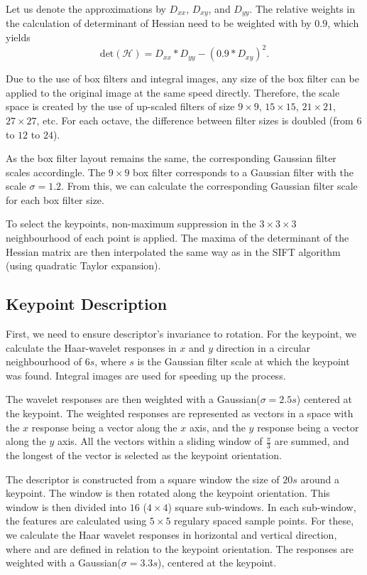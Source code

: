 Let us denote the approximations by $D_{xx}$, $D_{xy}$, and $D_{yy}$. The relative weights in the calculation of determinant of Hessian need to be weighted with by $0.9$, which yields
\begin{equation}
    \text{det}(\mathcal{H}) = D_{xx} * D_{yy} - (0.9 * D_{xy})^{2}.
\end{equation}

Due to the use of box filters and integral images, any size of the box filter can be applied to the original image at the same speed directly. Therefore, the scale space is created by the use of up-scaled filters of size $9\times9$, $15\times15$, $21\times21$, $27\times27$, etc. For each octave, the difference between filter sizes is doubled (from $6$ to $12$ to $24$).

As the box filter layout remains the same, the corresponding Gaussian filter scales accordingle. The $9\times9$ box filter corresponds to a Gaussian filter with the scale $\sigma = 1.2$. From this, we can calculate the corresponding Gaussian filter scale for each box filter size.

To select the keypoints, non-maximum suppression in the $3\times3\times3$ neighbourhood of each point is applied. The maxima of the determinant of the Hessian matrix are then interpolated the same way as in the SIFT algorithm (using quadratic Taylor expansion).

\subsection{Keypoint Description}
First, we need to ensure descriptor's invariance to rotation. For the keypoint, we calculate the Haar-wavelet responses in $x$ and $y$ direction in a circular neighbourhood of $6s$, where $s$ is the Gaussian filter scale at which the keypoint was found. Integral images are used for speeding up the process.

The wavelet responses are then weighted with a Gaussian($\sigma = 2.5 s$) centered at the keypoint. The weighted responses are represented as vectors in a space with the $x$ response being a vector along the $x$ axis, and the $y$ response being a vector along the $y$ axis. All the vectors within a sliding window of $\frac{\pi}{3}$ are summed, and the longest of the vector is selected as the keypoint orientation.

The descriptor is constructed from a square window the size of $20s$ around a keypoint. The window is then rotated along the keypoint orientation. This window is then divided into $16$ ($4\times4$) square sub-windows. In each sub-window, the features are calculated using $5\times5$ regulary spaced sample points. For these, we calculate the Haar wavelet responses in horizontal and vertical direction, where  and  are defined in relation to the keypoint orientation. The responses are weighted with a Gaussian($\sigma = 3.3s$), centered at the keypoint.

